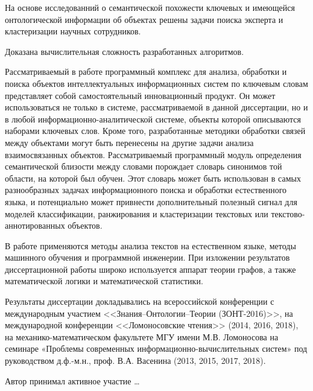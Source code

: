 На основе исследованний о семантической похожести ключевых и имеющейся онтологической информации об объектах решены задачи поиска эксперта и кластеризации научных сотрудников.

Доказана вычислительная сложность разработанных алгоритмов.

{\influence} Рассматриваемый в работе программный комплекс для анализа, обработки и поиска объектов интеллектуальных информационных систем по ключевым словам представляет собой самостоятельный инновационный продукт. Он может использоваться не только в системе, рассматриваемой в данной диссертации, но и в любой информационно-аналитической системе, объекты которой описываются наборами ключевых слов. Кроме того, разработанные методики обработки связей между объектами могут быть перенесены на другие задачи анализа взаимосвязанных объектов. Рассматриваемый программный модуль определения семантической близости между словами  порождает словарь синонимов той области, на которой был обучен. Этот словарь может быть использован в самых разнообразных задачах информационного поиска и обработки естественного языка, и потенциально может привнести дополнительный полезный сигнал для моделей классификации, ранжирования и кластеризации текстовых или текстово-аннотированных объектов.

{\methods} В работе применяются методы анализа текстов на естественном языке, методы машинного обучения и программной инженерии. При изложении результатов диссертационной работы широко используется аппарат теории графов, а также математической логики и математической статистики.

{\probation} Результаты диссертации докладывались на всероссийской конференции с международным участием <<Знания–Онтологии–Теории (ЗОНТ-2016)>>, на международной конференции <<Ломоносовские чтения>> (2014, 2016, 2018),  на механико-математическом факультете МГУ имени М.В. Ломоносова на семинаре «Проблемы современных информационно-вычислительных систем» под руководством д.ф.-м.н., проф. В.А. Васенина (2013, 2015, 2017, 2018).

{\contribution} Автор принимал активное участие \ldots

